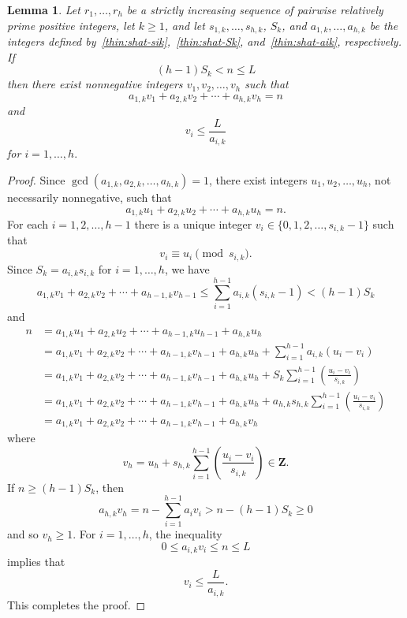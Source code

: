 \documentclass{amsart}
\newtheorem{lemma}{Lemma}
\begin{document}
\begin{lemma}       \label{thin:lemma:shat3}
Let $r_1,\ldots, r_h$ be a strictly increasing sequence of pairwise relatively prime positive integers, let $k \geq 1$, and let $s_{1,k},\ldots, s_{h,k}$, $S_k$, and $a_{1,k},\ldots, a_{h,k}$ be the integers defined by~\eqref{thin:shat-sik},~\eqref{thin:shat-Sk}, and~\eqref{thin:shat-aik}, respectively.   If 
\[
(h-1)S_k < n \leq L
\]
then there exist nonnegative integers $v_1, v_2, \ldots, v_h$ such that 
\[
a_{1,k}v_1 + a_{2,k}v_2 + \cdots + a_{h,k}v_h = n
\]
and
\[
v_i \leq  \frac{L}{a_{i,k}}
\]
for $i=1,\ldots, h.$
\end{lemma}

\begin{proof}
Since $\gcd( a_{1,k}, a_{2,k}, \ldots, a_{h,k} ) = 1$, there exist integers $u_1,u_2,\ldots,u_h$, not necessarily nonnegative, such that 
\[
a_{1,k}u_1 + a_{2,k}u_2 + \cdots + a_{h,k}u_h = n.
\]
For each $i = 1,2,\ldots, h-1$ there is a unique integer $v_i \in \{0,1,2,\ldots, s_{i,k}-1\}$  such that 
\[
v_i \equiv u_i \pmod{s_{i,k}}.
\]
Since $S_k = a_{i,k}s_{i,k}$ for $i = 1,\ldots, h$, we have 
\[
 a_{1,k}v_1 + a_{2,k}v_2 + \cdots + a_{h-1,k}v_{h-1} \leq 
 \sum_{i=1}^{h-1}a_{i,k}(s_{i,k}-1) <  (h-1)S_k
 \]
and
\begin{align*}
n & =  a_{1,k}u_1 + a_{2,k}u_2 + \cdots + a_{h-1,k}u_{h-1} + a_{h,k}u_h \\
& =  a_{1,k}v_1 + a_{2,k}v_2 + \cdots + a_{h-1,k}v_{h-1} + a_{h,k}u_h + \sum_{i=1}^{h-1} a_{i,k} (u_i-v_i) \\
& = a_{1,k}v_1 + a_{2,k}v_2 + \cdots + a_{h-1,k}v_{h-1} + 
a_{h,k}u_h + S_k \sum_{i=1}^{h-1} \left( \frac{u_i-v_i}{s_{i,k}} \right)  \\
& = a_{1,k}v_1 + a_{2,k}v_2 + \cdots + a_{h-1,k}v_{h-1} + 
a_{h,k}u_h + a_{h,k}s_{h,k} \sum_{i=1}^{h-1} \left( \frac{u_i-v_i}{s_{i,k}} \right)  \\
& = a_{1,k}v_1 + a_{2,k}v_2 + \cdots + a_{h-1,k}v_{h-1} + a_{h,k}v_h
\end{align*}
where 
\[
v_h = u_h + s_{h,k} \sum_{i=1}^{h-1} \left( \frac{u_i-v_i}{s_{i,k}} \right) \in {\ensuremath{\mathbf Z}}.
\]
If $n \geq (h-1)S_k$, then 
\[
a_{h,k}v_h = n - \sum_{i=1}^{h-1} a_iv_i >  n - (h-1)S_k \geq 0
\]
and so $v_h \geq 1$.  
For $i=1,\ldots, h$, the inequality  
\[
0 \leq a_{i,k}v_i \leq n \leq L
\]
implies that  
\[
v_i \leq \frac{L}{a_{i,k}}.
\]
This completes the proof.
\end{proof}
\end{document}
